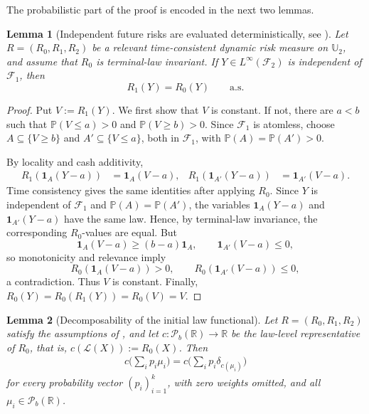 \documentclass[a4paper]{amsart}
\newtheorem{lemma}[lemma]{Lemma}
\theoremstyle{definition}
\newcommand{\R}{\mathbb{R}}
\newcommand{\F}{\mathcal{F}}
\newcommand{\law}{\mathcal{L}}
\newcommand{\Pc}{\mathcal P}
\renewcommand{\subset}{\subseteq}
\renewcommand{\P}{\mathbb{P}}
\begin{document}
The probabilistic part of the proof is encoded in the next two lemmas.

\begin{lemma}[Independent future risks are evaluated deterministically, see {\cite[Lemma 2.2]{KupperSchachermayer2009}}]
\label{lem:KS-independent-two-period}
Let \(R=(R_0,R_1,R_2)\) be a relevant time-consistent dynamic risk measure on
\(\mathbb U_2\), and assume that \(R_0\) is terminal-law invariant. If
\(Y\in L^\infty(\F_2)\) is independent of \(\F_1\), then
\[
R_1(Y)=R_0(Y)
\qquad\text{a.s.}
\]
\end{lemma}

\begin{proof}
Put \(V:=R_1(Y)\). We first show that \(V\) is constant. If not, there are
\(a<b\) such that \(\P(V\le a)>0\) and \(\P(V\ge b)>0\). Since \(\F_1\) is
atomless, choose \(A\subset\{V\ge b\}\) and \(A'\subset\{V\le a\}\), both in
\(\F_1\), with \(\P(A)=\P(A')>0\).

By locality and cash additivity,
\begin{align}
R_1(\mathbf 1_A(Y-a))&=\mathbf 1_A(V-a),
&
R_1(\mathbf 1_{A'}(Y-a))&=\mathbf 1_{A'}(V-a).
\label{eq:KS-independent-locality}
\end{align}
Time consistency gives the same identities after applying \(R_0\). Since \(Y\)
is independent of \(\F_1\) and \(\P(A)=\P(A')\), the variables
\(\mathbf 1_A(Y-a)\) and \(\mathbf 1_{A'}(Y-a)\) have the same law. Hence,
by terminal-law invariance, the corresponding \(R_0\)-values are equal. But
\[
\mathbf 1_A(V-a)\ge (b-a)\mathbf 1_A,
\qquad
\mathbf 1_{A'}(V-a)\le0,
\]
so monotonicity and relevance imply
\[
R_0(\mathbf 1_A(V-a))>0,
\qquad
R_0(\mathbf 1_{A'}(V-a))\le0,
\]
a contradiction. Thus \(V\) is constant. Finally,
\(R_0(Y)=R_0(R_1(Y))=R_0(V)=V\).
\end{proof}

\begin{lemma}[Decomposability of the initial law functional]
\label{lem:KS-initial-decomposable-two-period}
Let \(R=(R_0,R_1,R_2)\) satisfy the assumptions of
, and let \(c:\Pc_b(\R)\to\R\) be the
law-level representative of \(R_0\), that is, \(c(\law(X)):=R_0(X)\). Then
\begin{align}
c\Big(\sum_i p_i\mu_i\Big)
=
c\Big(\sum_i p_i\delta_{c(\mu_i)}\Big)
\label{eq:KS-c-decomposable}
\end{align}
for every probability vector \((p_i)_{i=1}^k\), with zero weights omitted, and
all \(\mu_i\in\Pc_b(\R)\).
\end{lemma}
\end{document}

